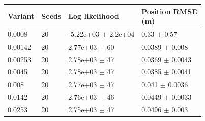 \begin{tabular}{llll}
\toprule
Variant & Seeds & Log likelihood & \shortstack[l]{Position RMSE\\(m)} \\
\midrule
0.0008 & 20 & -5.22e+03 $\pm$ 2.2e+04 & 0.33 $\pm$ 0.57 \\
0.00142 & 20 & 2.77e+03 $\pm$ 60 & 0.0389 $\pm$ 0.008 \\
0.00253 & 20 & 2.78e+03 $\pm$ 47 & 0.0369 $\pm$ 0.0043 \\
0.0045 & 20 & 2.78e+03 $\pm$ 47 & 0.0385 $\pm$ 0.0041 \\
0.008 & 20 & 2.77e+03 $\pm$ 47 & 0.041 $\pm$ 0.0036 \\
0.0142 & 20 & 2.76e+03 $\pm$ 46 & 0.0449 $\pm$ 0.0033 \\
0.0253 & 20 & 2.75e+03 $\pm$ 47 & 0.0496 $\pm$ 0.003 \\
\bottomrule
\end{tabular}
